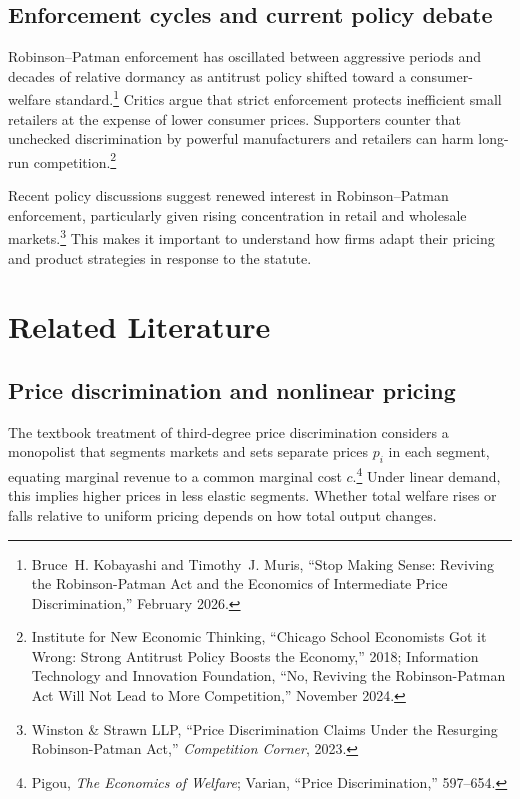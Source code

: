 \documentclass[12pt]{article}
\theoremstyle{definition}
\begin{document}
\subsection{Enforcement cycles and current policy debate}

Robinson--Patman enforcement has oscillated between aggressive periods and decades of relative dormancy as antitrust policy shifted toward a consumer-welfare standard.\footnote{Bruce~H. Kobayashi and Timothy~J. Muris, ``Stop Making Sense: Reviving the Robinson-Patman Act and the Economics of Intermediate Price Discrimination,'' February 2026.}
Critics argue that strict enforcement protects inefficient small retailers at the expense of lower consumer prices. Supporters counter that unchecked discrimination by powerful manufacturers and retailers can harm long-run competition.\footnote{Institute for New Economic Thinking, ``Chicago School Economists Got it Wrong: Strong Antitrust Policy Boosts the Economy,'' 2018; Information Technology and Innovation Foundation, ``No, Reviving the Robinson-Patman Act Will Not Lead to More Competition,'' November 2024.}

Recent policy discussions suggest renewed interest in Robinson--Patman enforcement, particularly given rising concentration in retail and wholesale markets.\footnote{Winston \& Strawn LLP, ``Price Discrimination Claims Under the Resurging Robinson-Patman Act,'' \textit{Competition Corner}, 2023.}
This makes it important to understand how firms adapt their pricing and product strategies in response to the statute.


\section{Related Literature}\label{sec:literature}

\subsection{Price discrimination and nonlinear pricing}

The textbook treatment of third-degree price discrimination considers a monopolist that segments markets and sets separate prices $p_i$ in each segment, equating marginal revenue to a common marginal cost $c$.\footnote{Pigou, \textit{The Economics of Welfare}; Varian, ``Price Discrimination,'' 597--654.}
Under linear demand, this implies higher prices in less elastic segments. Whether total welfare rises or falls relative to uniform pricing depends on how total output changes.
\end{document}
